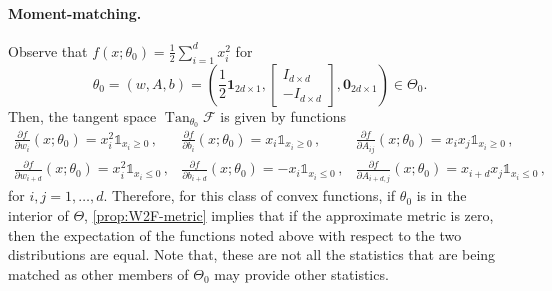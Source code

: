 \documentclass[10pt]{article}
\newcommand{\one}{\mathbf{1}}
\newcommand{\zero}{\mathbf{0}}
\newcommand{\op}[1]{\operatorname{#1}}
\newcommand{\Tan}{\op{Tan}}
\newcommand{\calF}{\mathcal{F}}
\numberwithin{equation}{section}
\begin{document}
\paragraph{Moment-matching.}
	Observe that $f(x;\theta_0) = \frac{1}{2}\sum_{i=1}^d x_i^2$ for
	\begin{equation*}
	\theta_0=(w,A,b)=( \frac{1}{2} \one_{2d\times 1} ,\begin{bmatrix}
	I_{d\times d} \\ -I_{d\times d} 
	\end{bmatrix}
	,\zero_{2d\times 1}) \in \Theta_0.
	\end{equation*}
	Then, the tangent space $\Tan_{\theta_0}\calF$ is given by functions
	\begin{equation*}\begin{array}{lll}
	\frac{\partial f}{\partial w_i}(x;\theta_0) = x_i^2\mathds{1}_{x_i\geq 0}\,,&
	\frac{\partial f}{\partial b_i}(x;\theta_0) =x_i\mathds{1}_{x_i\geq 0}\,,&
	\frac{\partial f}{\partial A_{ij}}(x;\theta_0) =x_ix_j\mathds{1}_{x_i\geq 0}\,,\\
	\frac{\partial f}{\partial w_{i+d}}(x;\theta_0) = x_i^2\mathds{1}_{x_i\leq 0}\,,&
	\frac{\partial f}{\partial b_{i+d}}(x;\theta_0) =-x_i\mathds{1}_{x_i\leq 0}\,,&
	\frac{\partial f}{\partial A_{i+d,j}}(x;\theta_0) =x_{i+d}x_j\mathds{1}_{x_i\leq 0}\,,
	\end{array}\end{equation*}
	for $i,j=1,\ldots, d$. 
	Therefore, for this class of convex functions, if $\theta_0$ is in the interior of $\Theta$, \autoref{prop:W2F-metric} implies that if the approximate metric is zero, then the expectation of the functions noted above with respect to the two distributions are equal. Note that, these are not all the statistics that are being matched as other members of $\Theta_0$ may provide other statistics. 
\end{document}
